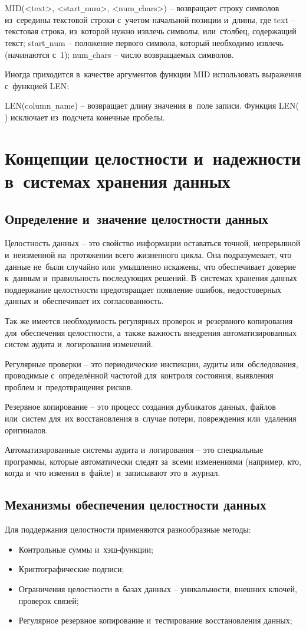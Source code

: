 \documentclass{ou}
\begin{document}
MID(<text>, <start\verb|_|num>, <num\verb|_|chars>) -- возвращает строку символов из~середины текстовой строки с~учетом начальной позиции и~длины, где text -- текстовая строка, из~которой нужно извлечь символы, или~столбец, содержащий текст; start\verb|_|num -- положение первого символа, который необходимо извлечь (начинаются с~1); num\verb|_|chars -- число возвращаемых символов.

Иногда приходится в~качестве аргументов функции MID использовать выражения с~функцией LEN: 
 
LEN(column\verb|_|name) -- возвращает длину значения в~поле записи. Функция LEN( ) исключает из~подсчета конечные пробелы.
\newpage
\section{Концепции целостности и~надежности в~системах хранения данных}
\subsection{Определение и~значение целостности данных}
Целостность данных -- это свойство информации оставаться точной, непрерывной и~неизменной на~протяжении всего жизненного цикла. Она подразумевает, что данные не~были случайно или~умышленно искажены, что обеспечивает доверие к~данным и~правильность последующих решений. В~системах хранения данных поддержание целостности предотвращает появление ошибок, недостоверных данных и~обеспечивает их согласованность.

Так же имеется необходимость регулярных проверок и~резервного копирования для~обеспечения целостности, а~также важность внедрения автоматизированных систем аудита и~логирования изменений.

Регулярные проверки -- это периодические инспекции, аудиты или~обследования, проводимые с~определённой частотой для~контроля состояния, выявления проблем и~предотвращения рисков.

Резервное копирование -- это процесс создания дубликатов данных, файлов или~систем для~их восстановления в~случае потери, повреждения или~удаления оригиналов.

Автоматизированные системы аудита и~логирования -- это специальные программы, которые автоматически следят за~всеми изменениями (например, кто, когда и~что изменил в~файле) и~записывают это в~журнал.
\subsection{Механизмы обеспечения целостности данных}
Для поддержания целостности применяются разнообразные методы:
\begin{itemize}[label=-, leftmargin=0em, itemindent=3.35em, nosep]
\item Контрольные суммы и~хэш-функции;
\item Криптографические подписи;
\item Ограничения целостности в~базах данных -- уникальности, внешних ключей, проверок связей;
\item Регулярное резервное копирование и~тестирование восстановления данных;
\end{itemize}
\end{document}
